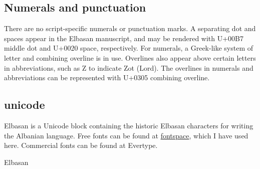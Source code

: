 \subsection{Numerals and punctuation}

There are no script-specific numerals or punctuation marks.
A separating dot and spaces appear in the Elbasan manuscript, and may be rendered with
U+00B7 middle dot and U+0020 space, respectively. For numerals, a Greek-like system
of letter and combining overline is in use. Overlines also appear above certain letters in
abbreviations, such as Z to indicate Zot (Lord). The overlines in numerals and abbreviations
can be represented with U+0305 combining overline. 

\subsection{unicode}

Elbasan is a Unicode block containing the historic Elbasan characters for writing the Albanian language. Free fonts can be found at \href{http://www.fontspace.com/category/unicode\%20font\%20for\%20elbasan}{fontspace}, which I have used here. Commercial fonts can be found at Evertype.

\begin{scriptexample}[]{Elbasan}
\end{scriptexample}